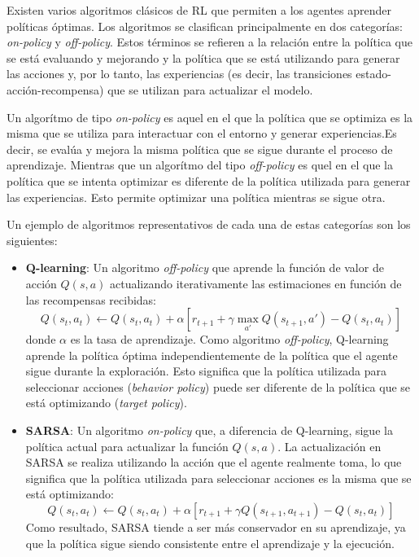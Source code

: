 \documentclass[a4paper,12pt, twoside]{report}
\begin{document}
Existen varios algoritmos clásicos de RL que permiten a los agentes aprender políticas óptimas. Los 
algoritmos se clasifican principalmente en dos categorías: \textit{on-policy} y \textit{off-policy}. 
Estos términos se refieren a la relación entre la política que se está evaluando y mejorando y la 
política que se está utilizando para generar las acciones y, por lo tanto, las experiencias (es decir, 
las transiciones estado-acción-recompensa) que se utilizan para actualizar el modelo.

Un algorítmo de tipo \textit{on-policy} es aquel en el que la política que se optimiza es la misma que 
se utiliza para interactuar con el entorno y generar experiencias.Es decir, se evalúa y mejora la misma
política que se sigue durante el proceso de aprendizaje. Mientras que un algorítmo del tipo \textit{off-policy}
es quel en el que la política que se intenta optimizar es diferente de la política utilizada para generar
las experiencias. Esto permite optimizar una política mientras se sigue otra.

Un ejemplo de algoritmos representativos de cada una de estas categorías son los siguientes:

\begin{itemize}
    \item \textbf{Q-learning}: Un algoritmo \textit{off-policy} que aprende la función de valor de 
    acción \(Q(s, a)\) actualizando iterativamente las estimaciones en función de las recompensas recibidas:
    \[
    Q(s_t, a_t) \leftarrow Q(s_t, a_t) + \alpha \left[r_{t+1} + \gamma \max_{a'} Q(s_{t+1}, a') - Q(s_t, a_t)\right]
    \]
    donde \(\alpha\) es la tasa de aprendizaje. Como algoritmo \textit{off-policy}, Q-learning aprende la 
    política óptima independientemente de la política que el agente sigue durante la exploración. 
    Esto significa que la política utilizada para seleccionar acciones (\textit{behavior policy}) 
    puede ser diferente de la política que se está optimizando (\textit{target policy}).

    \item \textbf{SARSA}: Un algoritmo \textit{on-policy} que, a diferencia de Q-learning, sigue la 
    política actual para actualizar la función \(Q(s, a)\). La actualización en SARSA se realiza 
    utilizando la acción que el agente realmente toma, lo que significa que la política utilizada 
    para seleccionar acciones es la misma que se está optimizando:
    \[
    Q(s_t, a_t) \leftarrow Q(s_t, a_t) + \alpha \left[r_{t+1} + \gamma Q(s_{t+1}, a_{t+1}) - Q(s_t, a_t)\right]
    \]
    Como resultado, SARSA tiende a ser más conservador en su aprendizaje, ya que la política sigue 
    siendo consistente entre el aprendizaje y la ejecución.

\end{itemize}
\end{document}
